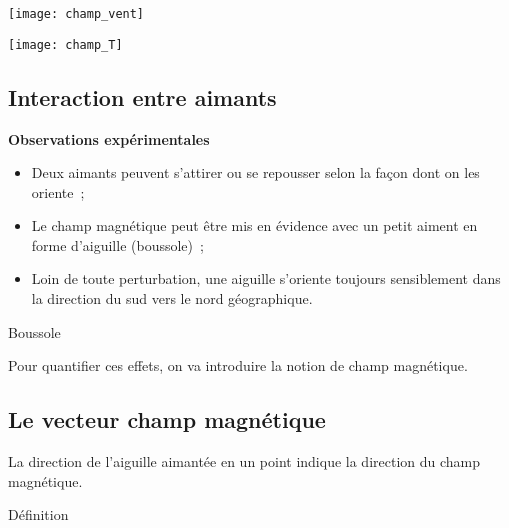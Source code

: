 \documentclass[../main/main.tex]{subfiles}
\begin{document}
\noindent
\begin{minipage}[t]{.5\linewidth}
	\centering
	\texttt{[image: champ\_vent]}
	\label{fig:chpvent}
\end{minipage}
\hfill
\begin{minipage}[t]{.5\linewidth}
	\centering
	\texttt{[image: champ\_T]}
	\label{fig:chpT}
\end{minipage}

\subsection{Interaction entre aimants}
\textbf{Observations expérimentales}
\begin{itemize}[label=$\diamond$, leftmargin=10pt]
	\item Deux aimants peuvent s'attirer ou se repousser selon la façon dont on
	      les oriente~;
	\item Le champ magnétique peut être mis en évidence avec un petit aiment en
	      forme d'aiguille (boussole)~;
	\item Loin de toute perturbation, une aiguille s'oriente toujours sensiblement
	      dans la direction du sud vers le nord géographique.
\end{itemize}
\begin{tdefi}{Boussole}
	\begin{center}
	\end{center}
\end{tdefi}
Pour quantifier ces effets, on va introduire la notion de champ magnétique.

\subsection{Le vecteur champ magnétique}
La direction de l'aiguille aimantée en un point indique la direction du champ
magnétique.
\begin{tdefi}{Définition}
\end{tdefi}
\end{document}
